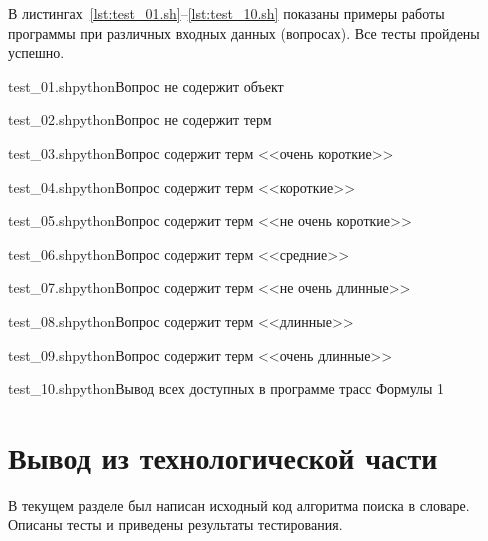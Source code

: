 В листингах~\ref{lst:test_01.sh}--\ref{lst:test_10.sh} показаны примеры работы программы при различных входных данных (вопросах). 
Все тесты пройдены успешно.

{test_01.sh}{python}{Вопрос не содержит объект}

{test_02.sh}{python}{Вопрос не содержит терм}

{test_03.sh}{python}{Вопрос содержит терм <<очень короткие>>}

{test_04.sh}{python}{Вопрос содержит терм <<короткие>>}

{test_05.sh}{python}{Вопрос содержит терм <<не очень короткие>>}

{test_06.sh}{python}{Вопрос содержит терм <<средние>>}

{test_07.sh}{python}{Вопрос содержит терм <<не очень длинные>>}

{test_08.sh}{python}{Вопрос содержит терм <<длинные>>}

{test_09.sh}{python}{Вопрос содержит терм <<очень длинные>>}

{test_10.sh}{python}{Вывод всех доступных в программе трасс Формулы 1}

\section*{Вывод из технологической части}

В текущем разделе был написан исходный код алгоритма поиска в словаре. 
Описаны тесты и приведены результаты тестирования.

